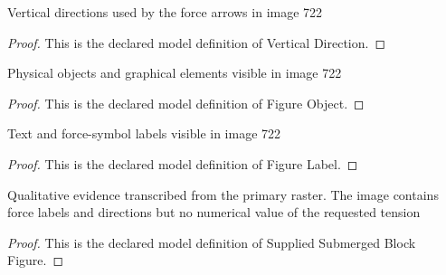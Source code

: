 \begin{definition}
  \label{def:physics:phyx-mini-0722:phyxminiproblems-problemphyxmini0722-verticaldirection}
  Vertical directions used by the force arrows in image 722
\end{definition}
\begin{proof}
  This is the declared model definition of Vertical Direction.
\end{proof}
\begin{definition}
  \label{def:physics:phyx-mini-0722:phyxminiproblems-problemphyxmini0722-figureobject}
  Physical objects and graphical elements visible in image 722
\end{definition}
\begin{proof}
  This is the declared model definition of Figure Object.
\end{proof}
\begin{definition}
  \label{def:physics:phyx-mini-0722:phyxminiproblems-problemphyxmini0722-figurelabel}
  Text and force-symbol labels visible in image 722
\end{definition}
\begin{proof}
  This is the declared model definition of Figure Label.
\end{proof}
\begin{definition}
  \label{def:physics:phyx-mini-0722:phyxminiproblems-problemphyxmini0722-suppliedsubmergedblockfigure}
  Qualitative evidence transcribed from the primary raster. The image contains force labels and directions but no numerical value of the requested tension
\end{definition}
\begin{proof}
  This is the declared model definition of Supplied Submerged Block Figure.
\end{proof}
